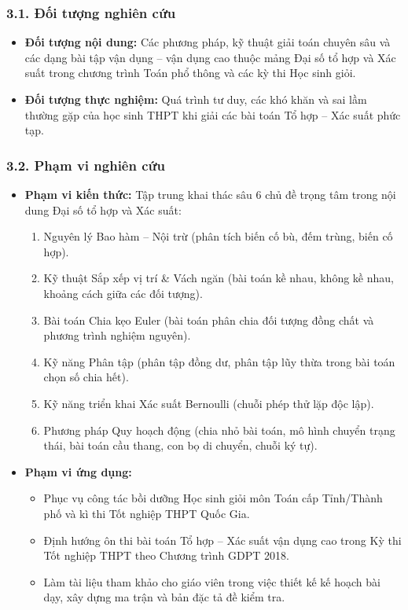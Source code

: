\documentclass[12pt, a4paper]{article}
\begin{document}
			\subsubsection*{3.1. Đối tượng nghiên cứu}
			\begin{itemize}[leftmargin=*]
				\item \textbf{Đối tượng nội dung:} Các phương pháp, kỹ thuật giải toán chuyên sâu và các dạng bài tập vận dụng -- vận dụng cao thuộc mảng Đại số tổ hợp và Xác suất trong chương trình Toán phổ thông và các kỳ thi Học sinh giỏi.
				\item \textbf{Đối tượng thực nghiệm:} Quá trình tư duy, các khó khăn và sai lầm thường gặp của học sinh THPT khi giải các bài toán Tổ hợp -- Xác suất phức tạp.
			\end{itemize}			
			\subsubsection*{3.2. Phạm vi nghiên cứu}
			\begin{itemize}[leftmargin=*]
				\item \textbf{Phạm vi kiến thức:} Tập trung khai thác sâu 6 chủ đề trọng tâm trong nội dung Đại số tổ hợp và Xác suất:
				\begin{enumerate}[label=\arabic*.]
					\item Nguyên lý Bao hàm -- Nội trừ (phân tích biến cố bù, đếm trùng, biến cố hợp).
					\item Kỹ thuật Sắp xếp vị trí \& Vách ngăn (bài toán kề nhau, không kề nhau, khoảng cách giữa các đối tượng).
					\item Bài toán Chia kẹo Euler (bài toán phân chia đối tượng đồng chất và phương trình nghiệm nguyên).
					\item Kỹ năng Phân tập (phân tập đồng dư, phân tập lũy thừa trong bài toán chọn số chia hết).
					\item Kỹ năng triển khai Xác suất Bernoulli (chuỗi phép thử lặp độc lập).
					\item Phương pháp Quy hoạch động (chia nhỏ bài toán, mô hình chuyển trạng thái, bài toán cầu thang, con bọ di chuyển, chuỗi ký tự).
				\end{enumerate}
				\item \textbf{Phạm vi ứng dụng:}
				\begin{itemize}
					\item Phục vụ công tác bồi dưỡng Học sinh giỏi môn Toán cấp Tỉnh/Thành phố và kì thi Tốt nghiệp THPT Quốc Gia.
					\item Định hướng ôn thi bài toán Tổ hợp -- Xác suất vận dụng cao trong Kỳ thi Tốt nghiệp THPT theo Chương trình GDPT 2018.
					\item Làm tài liệu tham khảo cho giáo viên trong việc thiết kế kế hoạch bài dạy, xây dựng ma trận và bản đặc tả đề kiểm tra.
				\end{itemize}
			\end{itemize}
	\newpage
\end{document}
